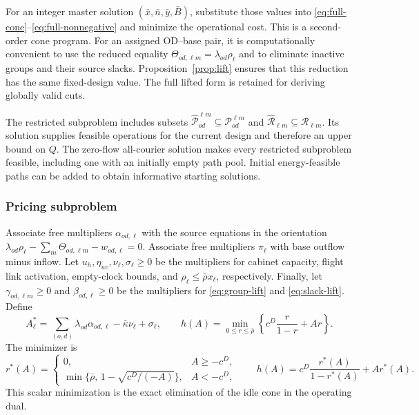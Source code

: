 \documentclass[final,3p,authoryear]{elsarticle}
\begin{document}
For an integer master solution $(\bar x,\bar n,\bar y,\bar B)$, substitute those values into \eqref{eq:full-cone}--\eqref{eq:full-nonnegative} and minimize the operational cost.
This is a second-order cone program.
For an assigned OD--base pair, it is computationally convenient to use the reduced equality $\Theta_{od,\ell m}=\lambda_{od}\rho_\ell$ and to eliminate inactive groups and their source slacks.
Proposition~\ref{prop:lift} ensures that this reduction has the same fixed-design value.
The full lifted form is retained for deriving globally valid cuts.

The restricted subproblem includes subsets $\widehat{\mathcal P}_{od}^{\ell m}\subseteq\mathcal P_{od}^{\ell m}$ and $\widehat{\mathcal R}_{\ell m}\subseteq\mathcal R_{\ell m}$.
Its solution supplies feasible operations for the current design and therefore an upper bound on $Q$.
The zero-flow all-courier solution makes every restricted subproblem feasible, including one with an initially empty path pool.
Initial energy-feasible paths can be added to obtain informative starting solutions.

\subsubsection{Pricing subproblem}

Associate free multipliers $\alpha_{od,\ell}$ with the source equations in the orientation $\lambda_{od}\rho_\ell-\sum_m\Theta_{od,\ell m}-w_{od,\ell}=0$.
Associate free multipliers $\pi_\ell$ with base outflow minus inflow.
Let $u_h,\eta_{uv},\nu_\ell,\sigma_\ell\ge0$ be the multipliers for cabinet capacity, flight link activation, empty-clock bounds, and $\rho_\ell\le\bar\rho x_\ell$, respectively.
Finally, let $\gamma_{od,\ell m}\ge0$ and $\beta_{od,\ell}\ge0$ be the multipliers for \eqref{eq:group-lift} and \eqref{eq:slack-lift}.
Define
\begin{equation}
 A_\ell^*=\sum_{(o,d)}\lambda_{od}\alpha_{od,\ell}
          -\bar\kappa\nu_\ell+\sigma_\ell,
 \qquad
 h(A)=\min_{0\le r\le\bar\rho}
       \left\{c^D\frac{r}{1-r}+Ar\right\}.
 \label{eq:idle-conjugate}
\end{equation}
The minimizer is
\begin{equation}
 r^*(A)=
 \begin{cases}
 0,&A\ge-c^D,\\
 \min\{\bar\rho,\,1-\sqrt{c^D/(-A)}\},&A<-c^D,
 \end{cases}
 \qquad
 h(A)=c^D\frac{r^*(A)}{1-r^*(A)}+Ar^*(A).
 \label{eq:idle-conjugate-closed}
\end{equation}
This scalar minimization is the exact elimination of the idle cone in the operating dual.
\end{document}
